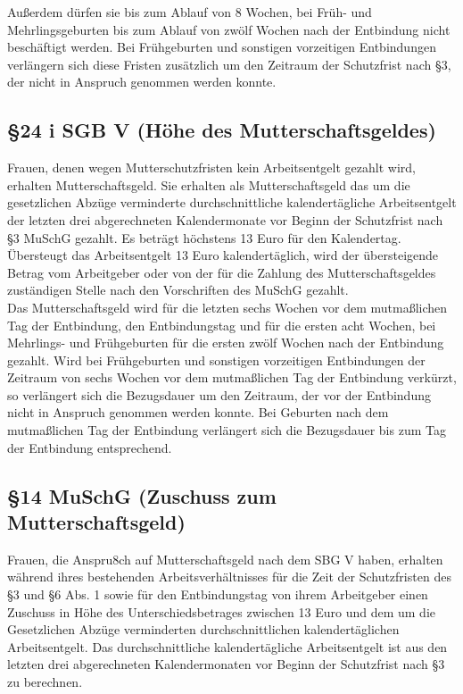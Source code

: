 \documentclass[a4paper, 12pt]{report}
\begin{document}
\begin{multicols}{2}
Außerdem dürfen sie bis zum Ablauf von 8 Wochen, bei Früh- und Mehrlingsgeburten
bis zum Ablauf von zwölf Wochen nach der Entbindung nicht beschäftigt werden.
Bei Frühgeburten und sonstigen vorzeitigen Entbindungen verlängern sich diese
Fristen zusätzlich um den Zeitraum der Schutzfrist nach \S 3, der nicht in
Anspruch genommen werden konnte.

\subsection{\S 24 i SGB V (Höhe des Mutterschaftsgeldes)}

Frauen, denen wegen Mutterschutzfristen kein Arbeitsentgelt gezahlt wird,
erhalten Mutterschaftsgeld. Sie erhalten als Mutterschaftsgeld das um die
gesetzlichen Abzüge verminderte durchschnittliche kalendertägliche
Arbeitsentgelt der letzten drei abgerechneten Kalendermonate vor Beginn der
Schutzfrist nach \S 3 MuSchG gezahlt. Es beträgt höchstens 13 Euro für den
Kalendertag. Übersteugt das Arbeitsentgelt 13 Euro kalendertäglich, wird der
übersteigende Betrag vom Arbeitgeber oder von der für die Zahlung des
Mutterschaftsgeldes zuständigen Stelle nach den Vorschriften des MuSchG
gezahlt. \\

Das Mutterschaftsgeld wird für die letzten sechs Wochen vor dem mutmaßlichen Tag
der Entbindung, den Entbindungstag und für die ersten acht Wochen, bei
Mehrlings- und Frühgeburten für die ersten zwölf Wochen nach der Entbindung
gezahlt. Wird bei Frühgeburten und sonstigen vorzeitigen Entbindungen der
Zeitraum von sechs Wochen vor dem mutmaßlichen Tag der Entbindung verkürzt, so
verlängert sich die Bezugsdauer um den Zeitraum, der vor der Entbindung nicht in
Anspruch genommen werden konnte. Bei Geburten nach dem mutmaßlichen Tag der
Entbindung verlängert sich die Bezugsdauer bis zum Tag der Entbindung
entsprechend.

\subsection{\S 14 MuSchG (Zuschuss zum Mutterschaftsgeld)}

Frauen, die Anspru8ch auf Mutterschaftsgeld nach dem SBG V haben, erhalten
während ihres bestehenden Arbeitsverhältnisses für die Zeit der Schutzfristen
des \S 3 und \S 6 Abs. 1 sowie für den Entbindungstag von ihrem Arbeitgeber
einen Zuschuss in Höhe des Unterschiedsbetrages zwischen 13 Euro und dem um die
Gesetzlichen Abzüge verminderten durchschnittlichen kalendertäglichen
Arbeitsentgelt. Das durchschnittliche kalendertägliche Arbeitsentgelt ist aus
den letzten drei abgerechneten Kalendermonaten vor Beginn der Schutzfrist nach
\S 3 zu berechnen. \\


\end{multicols}
\end{document}
